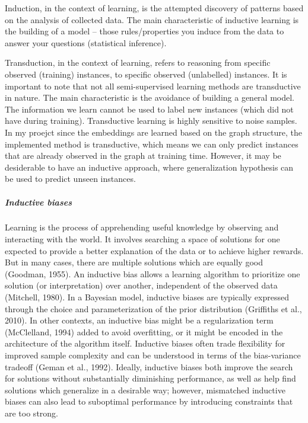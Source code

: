 \documentclass{report}
\begin{document}
Induction, in the context of learning, is the attempted discovery of patterns based on the analysis of collected data. The main characteristic of inductive learning is the building of a model – those rules/properties you induce from the data to answer your questions (statistical inference).

Transduction, in the context of learning, refers to reasoning from specific observed (training) instances, to specific observed (unlabelled) instances. It is important to note that not all semi-supervised learning methods are transductive in nature. The main characteristic is the avoidance of building a general model. The information we learn cannot be used to label new instances (which did not have during training). Transductive learning is highly sensitive to noise samples. In my proejct since the embeddings are learned based on the graph structure, the implemented method is transductive, which means we can only predict instances that are already observed in the graph at training time. However, it may be desiderable to have an inductive approach, where generalization hypothesis can be used to predict unseen instances.

\subparagraph{Inductive biases}
Learning is the process of apprehending useful knowledge by observing and interacting with the
world. It involves searching a space of solutions for one expected to provide a better explanation
of the data or to achieve higher rewards. But in many cases, there are multiple solutions which
are equally good (Goodman, 1955). An inductive bias allows a learning algorithm to prioritize
one solution (or interpretation) over another, independent of the observed data (Mitchell,
1980). In a Bayesian model, inductive biases are typically expressed through the choice and
parameterization of the prior distribution (Griffiths et al., 2010). In other contexts, an inductive
bias might be a regularization term (McClelland, 1994) added to avoid overfitting, or it might
be encoded in the architecture of the algorithm itself. Inductive biases often trade flexibility
for improved sample complexity and can be understood in terms of the bias-variance tradeoff
(Geman et al., 1992). Ideally, inductive biases both improve the search for solutions without
substantially diminishing performance, as well as help find solutions which generalize in a
desirable way; however, mismatched inductive biases can also lead to suboptimal performance
by introducing constraints that are too strong.\cite{ind_BIAS}
\end{document}
